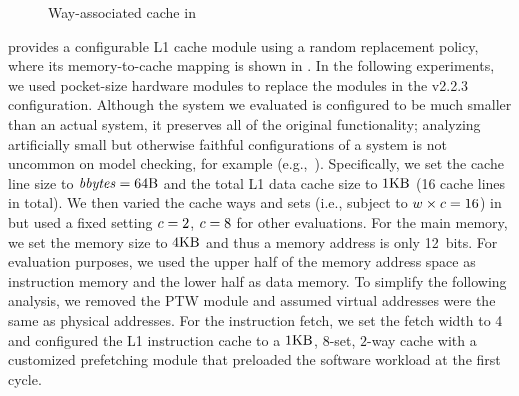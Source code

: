 \begin{figure}
\centering
\resizebox{0.6\linewidth}{!}{\protect\scriptsize}
\caption{Way-associated cache in \boom}
\label{fig:tagarray}
\end{figure}

\boom provides a configurable L1 cache module using a random
replacement policy, where its memory-to-cache mapping is shown in
.  In the following experiments, we used
pocket-size hardware modules to replace the modules in the \boom
v2.2.3 configuration. Although the system we evaluated is configured
to be much smaller than an actual system, it preserves all of the
original functionality; analyzing artificially small but otherwise
faithful configurations of a system is not uncommon on model checking,
for example (e.g.,~\cite{ball2004slam,pnueli2002small}).
Specifically, we set the cache line size to $\mathit{bbytes} = 64\mathrm{B}$
and the total L1 data cache size to $1\mathrm{KB}$ (16 cache lines in
total).  We then varied the cache ways \cacheLineNmbr and sets
\cachesetNmbr (i.e., subject to $w \times c =
16$) in  but used a fixed setting $c
= 2$, $c = 8$ for other evaluations.  For the main memory,
we set the memory size to $4\mathrm{KB}$ and thus a memory address is
only 12~bits. For evaluation purposes, we used the upper half of the
memory address space as instruction memory and the lower half as data
memory. To simplify the following analysis, we removed the \gls{PTW}
module and assumed virtual addresses were the same as physical
addresses.  For the instruction fetch, we set the fetch width to 4 and
configured the L1 instruction cache to a $1\mathrm{KB}$, $8$-set,
$2$-way cache with a customized prefetching module that preloaded the
software workload at the first cycle.

